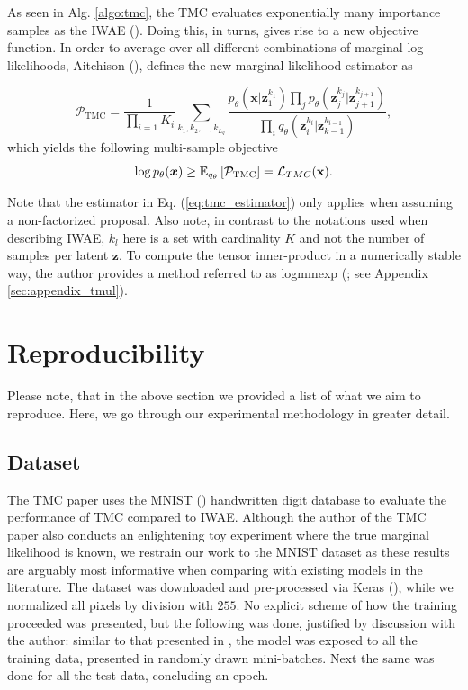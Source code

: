 \documentclass{article}
\begin{document}
As seen in Alg. \ref{algo:tmc}, the TMC 
evaluates exponentially many importance samples as the IWAE (\cite{tmc, iwae}). Doing this, in turns, gives rise to a new objective function. In order to average over all different combinations of marginal log-likelihoods, Aitchison (\cite{tmc}), defines the new marginal likelihood estimator as

\begin{equation}
    \mathcal{P}_{\text{TMC}} = \frac{1}{\prod\limits_{i=1} K_i}
    \sum\limits_{k_1, k_2, ..., k_{L_q}} \frac{p_{\theta}(\bm x|\bm z^{k_1}_1)\prod_{j}p_{\theta}(\bm z^{k_j}_{j}|\bm z^{k_{j+1}}_{j+1})}
    {\prod\limits_i q_{\theta}(\bm z_i^{k_i}| \bm z_{k-1}^{k_{i-1}})},
    \label{eq:tmc_estimator}
\end{equation}
which yields the following multi-sample objective
\begin{equation}
    \log p_{\theta}(\bm x) \geq \mathbb E_{q_{\theta}} \left[\mathcal{P}_{\text{TMC}}\right] = \mathcal{L}_{TMC} (\bold x).
    \label{eq:tmc_loss}
\end{equation}

Note that the estimator in Eq. (\ref{eq:tmc_estimator}) only applies when assuming a non-factorized proposal. Also note, in contrast to the notations used when describing IWAE, $k_l$ here is a set with cardinality $K$ and not the number of samples per latent $\bm z$. To compute the tensor inner-product in a numerically stable way, the author provides a method referred to as logmmexp (\cite{tmc}; see Appendix \ref{sec:appendix_tmul}).


\section{Reproducibility}
Please note, that in the above section we provided a list of what we aim to reproduce.
Here, we go through our experimental methodology in greater detail. 

\subsection{Dataset}
The TMC paper uses the MNIST (\cite{mnist}) handwritten digit database to evaluate the performance of TMC compared to IWAE. Although the author of the TMC paper also conducts an enlightening toy experiment where the true marginal likelihood is known, we restrain our work to the MNIST dataset as these results are arguably most informative when comparing with existing models in the literature. The dataset was downloaded and pre-processed via Keras (\cite{keras}), while we normalized all pixels by division with $255$. No explicit scheme of how the training proceeded was presented, but the following was done, justified by discussion with the author: similar to that presented in \cite{iwae}, the model was exposed to all the training data, presented in randomly drawn mini-batches. Next the same was done for all the test data, concluding an epoch.
\end{document}
